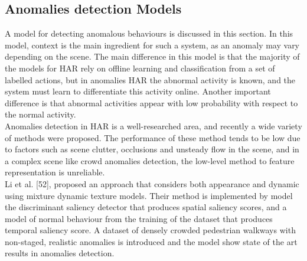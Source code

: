 \subsection{Anomalies detection Models}
\hspace{5mm} A model for detecting anomalous behaviours is discussed in this section. In this model, context is the main ingredient for such a system, as an anomaly may vary depending on the scene. The main difference in this model is that the majority of the models for HAR rely on offline learning and classification from a set of labelled actions, but in anomalies HAR the abnormal activity is known, and the system must learn to differentiate this activity online. Another important difference is that abnormal activities appear with low probability with respect to the normal activity. \\

Anomalies detection in HAR is a well-researched area, and recently a wide variety of methods were proposed. The performance of these method tends to be low due to factors such as scene clutter, occlusions and unsteady flow in the scene, and in a complex scene like crowd anomalies detection, the low-level method to feature representation is unreliable. \\
Li et al. [52], proposed an approach that considers both appearance and dynamic using mixture dynamic texture models. Their method is implemented by model the discriminant saliency detector that produces spatial saliency scores, and a model of normal behaviour from the training of the dataset that produces temporal saliency score. A dataset of densely crowded pedestrian walkways with non-staged, realistic anomalies is introduced and the model show state of the art results in anomalies detection. \\

